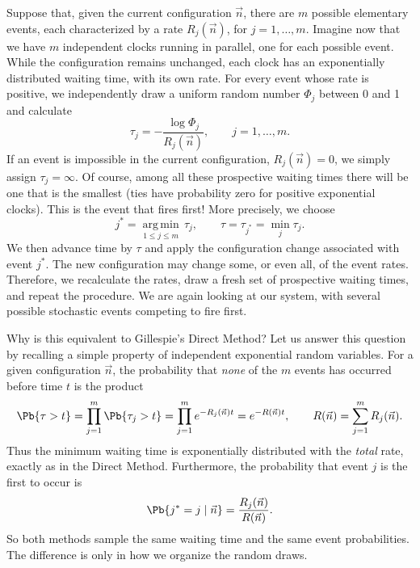 Suppose that, given the current configuration $\vec n$, there are $m$ possible elementary events, each characterized by a rate $R_j(\vec n)$, for $j=1,\ldots,m$. Imagine now that we have $m$ independent clocks running in parallel, one for each possible event. While the configuration remains unchanged, each clock has an exponentially distributed waiting time, with its own rate. For every event whose rate is positive, we independently draw a uniform random number $\Phi_j$ between 0 and 1 and calculate
\begin{equation}
 \tau_j=-\frac{\log\Phi_j}{R_j(\vec n)}, \qquad j=1,\ldots,m.
 \label{First_Reaction_Clocks}
\end{equation}
If an event is impossible in the current configuration, $R_j(\vec n)=0$, we simply assign $\tau_j=\infty$. Of course, among all these prospective waiting times there will be one that is the smallest (ties have probability zero for positive exponential clocks). This is the event that fires first! More precisely, we choose
\begin{equation}
 j^*=\underset{1\leq j\leq m}{\operatorname{arg\,min}}\,\tau_j,
 \qquad \tau=\tau_{j^*}=\min_j\tau_j.
 \label{First_Reaction_Minimum}
\end{equation}
We then advance time by $\tau$ and apply the configuration change associated with event $j^*$. The new configuration may change some, or even all, of the event rates. Therefore, we recalculate the rates, draw a fresh set of prospective waiting times, and repeat the procedure. We are again looking at our system, with several possible stochastic events competing to fire first.
\smallskip

Why is this equivalent to Gillespie's Direct Method? Let us answer this question by recalling a simple property of independent exponential random variables. For a given configuration $\vec n$, the probability that \emph{none} of the $m$ events has occurred before time $t$ is the product
\begin{equation}
 \Pb\{\tau>t\}
 =\prod_{j=1}^{m}\Pb\{\tau_j>t\}
 =\prod_{j=1}^{m}e^{-R_j(\vec n)t}
 =e^{-R(\vec n)t},
 \qquad R(\vec n)=\sum_{j=1}^{m}R_j(\vec n).
 \label{First_Reaction_Survival}
\end{equation}
Thus the minimum waiting time is exponentially distributed with the \emph{total} rate, exactly as in the Direct Method. Furthermore, the probability that event $j$ is the first to occur is
\begin{equation}
 \Pb\{j^*=j\mid\vec n\}
 =\frac{R_j(\vec n)}{R(\vec n)}.
 \label{First_Reaction_Choice}
\end{equation}
So both methods sample the same waiting time and the same event probabilities. The difference is only in how we organize the random draws.
\smallskip

